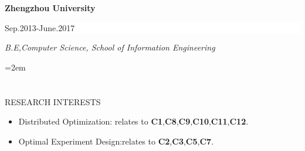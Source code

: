 \documentclass[paper=a4,fontsize=11pt]{scrartcl} %
\newcommand{\sepspace}{\vspace*{1em}}		%
\newcommand{\NewPart}[1]{\section*{\uppercase{#1}}}
\newcommand{\EducationEntry}[4]{
	\noindent \textbf{#1} \hfill      %
	\colorbox{White}{%
		\parbox{5cm}{%
			\hfill\color{Black}#2}} \par  %
	\noindent \textit{#3} \par        %
	\noindent\hangindent=2em\hangafter=0 \small #4 %
	\normalsize \par}
\begin{document}
		\sepspace
		
		\EducationEntry{Zhengzhou  University}{Sep.2013-June.2017}{B.E,Computer Science, School of Information Engineering  }
		
		\NewPart{RESEARCH INTERESTS}{}
		\begin{itemize}
			
			\item{Distributed Optimization}: relates to  \textbf{C1},\textbf{C8},\textbf{C9},\textbf{C10},\textbf{C11},\textbf{C12}. 
			\item{Optimal Experiment Design}:relates to  \textbf{C2},\textbf{C3},\textbf{C5},\textbf{C7}. 
			
			
	
			
		\end{itemize}
		
\end{document}
